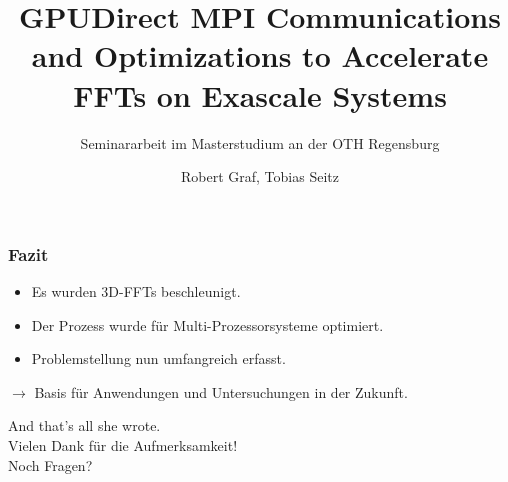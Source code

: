 \documentclass{beamer}
\title{GPUDirect MPI Communications and Optimizations to Accelerate FFTs on Exascale Systems}
\subtitle{Seminararbeit im Masterstudium an der OTH Regensburg}
\author{Robert Graf, Tobias Seitz}
\begin{document}
\frame
{
	\titlepage
}




\frame
{
	\frametitle{Fazit}
	\begin{itemize}
		\item Es wurden 3D-FFTs beschleunigt.
		\item Der Prozess wurde für Multi-Prozessorsysteme optimiert.
		\item Problemstellung nun umfangreich erfasst.
	\end{itemize}
	$\rightarrow$ Basis für Anwendungen und Untersuchungen in der Zukunft.
}

\frame
{
	\begin{center}
		And that's all she wrote.\\
		\Large Vielen Dank für die Aufmerksamkeit! \normalsize\\
		\tiny Noch Fragen? \normalsize
	\end{center}
}
\end{document}
